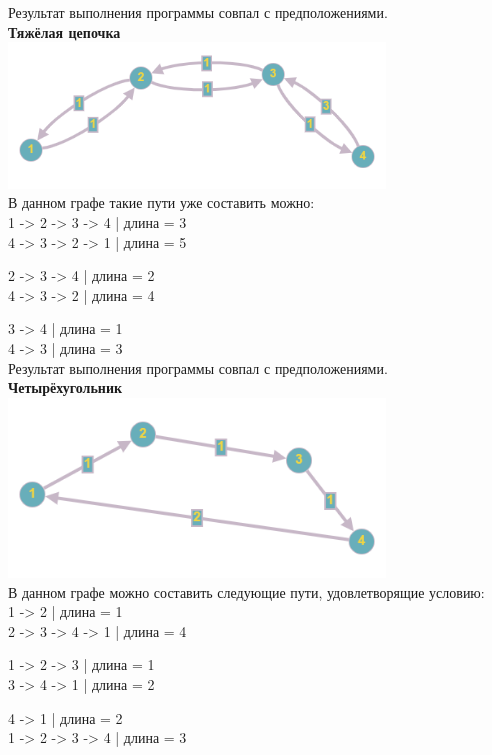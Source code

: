 \documentclass[a4paper,14pt]{extarticle}
\begin{document}
\begin{enumerate}[1.]
        Результат выполнения программы совпал с предположениями.\\

        \textbf{Тяжёлая цепочка}\\
        \includegraphics[width=100mm]{testHardChain}\\
        В данном графе такие пути уже составить можно:\\
        1 -> 2 -> 3 -> 4 | длина = 3\\
        4 -> 3 -> 2 -> 1 | длина = 5\bigbreak

        2 -> 3 -> 4 | длина = 2\\
        4 -> 3 -> 2 | длина = 4\bigbreak

        3 -> 4 | длина = 1\\
        4 -> 3 | длина = 3\\

        Результат выполнения программы совпал с предположениями.\\

        \textbf{Четырёхугольник}\\
        \includegraphics[width=100mm]{testFourSides}\\
        В данном графе можно составить следующие пути, удовлетворящие условию:\\
        1 -> 2 | длина = 1\\
        2 -> 3 -> 4 -> 1 | длина = 4\bigbreak

        1 -> 2 -> 3 | длина = 1\\
        3 -> 4 -> 1 | длина = 2\bigbreak

        4 -> 1 | длина = 2\\
        1 -> 2 -> 3 -> 4 | длина = 3\bigbreak


\end{enumerate}
\end{document}
